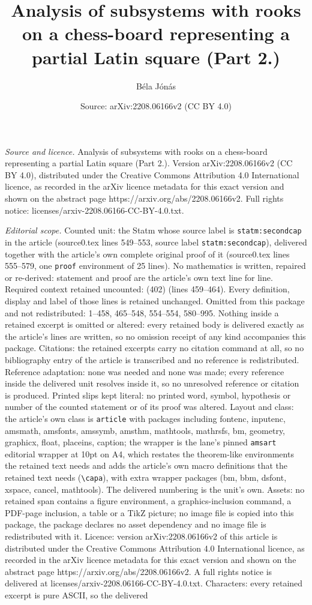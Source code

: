 \documentclass[10pt,a4paper]{amsart}
\title[Analysis of subsystems with rooks on a chess-board represent]{Analysis of subsystems with rooks on a chess-board representing a partial Latin square (Part 2.)}
\author{B\'ela J\'on\'as}
\date{Source: arXiv:2208.06166v2 (CC BY 4.0)}
\begin{document}
\maketitle

\noindent\emph{Source and licence.} Analysis of subsystems with rooks on a chess-board representing a partial Latin square (Part 2.). Version arXiv:2208.06166v2 (CC BY 4.0), distributed under the Creative Commons Attribution 4.0 International licence, as recorded in the arXiv licence metadata for this exact version and shown on the abstract page https://arxiv.org/abs/2208.06166v2. Full rights notice: licenses/arxiv-2208.06166-CC-BY-4.0.txt.\par\smallskip

\noindent\textit{Editorial scope.} Counted unit: the Statm whose source label is \texttt{statm:secondcap} in the article (source0.tex lines 549--553, source label \texttt{statm:secondcap}), delivered together with the article's own complete original proof of it (source0.tex lines 555--579, one \texttt{proof} environment of 25 lines). No mathematics is written, repaired or re-derived: statement and proof are the article's own text line for line. Required context retained uncounted: (402) (lines 459--464). Every definition, display and label of those lines is retained unchanged. Omitted from this package and not redistributed: 1--458, 465--548, 554--554, 580--995. Nothing inside a retained excerpt is omitted or altered: every retained body is delivered exactly as the article's lines are written, so no omission receipt of any kind accompanies this package. Citations: the retained excerpts carry no citation command at all, so no bibliography entry of the article is transcribed and no reference is redistributed. Reference adaptation: none was needed and none was made; every reference inside the delivered unit resolves inside it, so no unresolved reference or citation is produced. Printed slips kept literal: no printed word, symbol, hypothesis or number of the counted statement or of its proof was altered. Layout and class: the article's own class is \texttt{article} with packages including fontenc, inputenc, amsmath, amsfonts, amssymb, amsthm, mathtools, mathrsfs, bm, geometry, graphicx, float, placeins, caption; the wrapper is the lane's pinned \texttt{amsart} editorial wrapper at 10pt on A4, which restates the theorem-like environments the retained text needs and adds the article's own macro definitions that the retained text needs (\texttt{\textbackslash capa}), with extra wrapper packages (bm, bbm, dsfont, xspace, cancel, mathtools). The delivered numbering is the unit's own. Assets: no retained span contains a figure environment, a graphics-inclusion command, a PDF-page inclusion, a table or a TikZ picture; no image file is copied into this package, the package declares no asset dependency and no image file is redistributed with it. Licence: version arXiv:2208.06166v2 of this article is distributed under the Creative Commons Attribution 4.0 International licence, as recorded in the arXiv licence metadata for this exact version and shown on the abstract page https://arxiv.org/abs/2208.06166v2. A full rights notice is delivered at licenses/arxiv-2208.06166-CC-BY-4.0.txt. Characters: every retained excerpt is pure ASCII, so the delivered 
\end{document}
